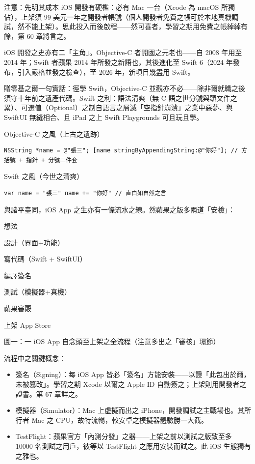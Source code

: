\begin{tcbwarn}{注意：先明其成本}
iOS 開發有硬檻：必有 Mac 一台（Xcode 為 macOS 所獨佔），上架須 99 美元一年之開發者帳號（個人開發者免費之帳可於本地真機調試，然不能上架）。思此投入而後啟程——然可喜者，學習之期用免費之帳綽綽有餘，第 60 章將言之。

\end{tcbwarn}


iOS 開發之史亦有二「主角」。Objective-C 者開國之元老也——自 2008 年用至 2014 年；Swift 者蘋果 2014 年所發之新語也，其後進化至 Swift 6（2024 年發布，引入嚴格並發之檢查），至 2026 年，新項目幾盡用 Swift。

贈零基之爾一句實話：徑學 Swift，Objective-C 並觀亦不必——除非爾就職之後須守十年前之遺產代碼。Swift 之利：語法清爽（無 C 語之世分號與頭文件之累）、可選值（Optional）之制自語言之層滅「空指針崩潰」之業中惡夢、與 SwiftUI 無縫相合、且 iPad 之上 Swift Playgrounds 可且玩且學。

Objective-C 之風（上古之遺跡）

\begin{lstlisting}
NSString *name = @"張三"; [name stringByAppendingString:@"你好"]; // 方括號 + 指針 + 分號三件套
\end{lstlisting}

Swift 之風（今世之清爽）

\begin{lstlisting}
var name = "張三" name += "你好" // 直白如自然之言
\end{lstlisting}


與諸平臺同，iOS App 之生亦有一條流水之線。然蘋果之版多兩道「安檢」：

想法

設計（界面+功能）

寫代碼（Swift + SwiftUI）

編譯簽名

測試（模擬器+真機）

蘋果審覈

上架 App Store

\begin{center}\small\color{gray}圖一：一 iOS App 自念頭至上架之全流程（注意多出之「審核」環節）\end{center}

流程中之關鍵概念：

\begin{itemize}
  \item 簽名（Signing）：每 iOS App 皆必「簽名」方能安裝——以證「此包出於爾，未被篡改」。學習之期 Xcode 以爾之 Apple ID 自動簽之；上架則用開發者之證書。第 67 章詳之。
  \item 模擬器（Simulator）：Mac 上虛擬而出之 iPhone，開發調試之主戰場也。其所行者 Mac 之 CPU，故特流暢，較安卓之模擬器體驗勝一大截。
  \item TestFlight：蘋果官方「內測分發」之器——上架之前以測試之版致至多 10000 名測試之用戶，彼等以 TestFlight 之應用安裝而試之。此 iOS 生態獨有之雅也。
\end{itemize}

